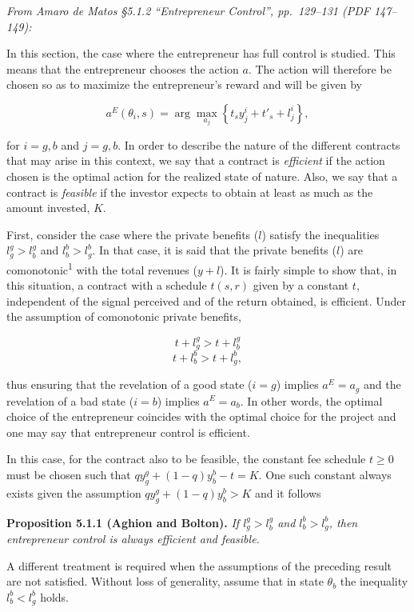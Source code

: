 \documentclass[11pt,a4paper]{article}
\begin{document}
\emph{From Amaro de Matos §5.1.2 ``Entrepreneur Control'', pp.~129--131 (PDF 147--149):}

In this section, the case where the entrepreneur has full control is studied. This means that the
entrepreneur chooses the action \(a\). The action will therefore be chosen so as to maximize the
entrepreneur's reward and will be given by

\[a^E(\theta_i, s) = \arg\max_{a_j}\left\{t_s y^i_j + t'_s + l^i_j\right\},\]

for \(i = g, b\) and \(j = g, b\). In order to describe the nature of the different contracts that
may arise in this context, we say that a contract is \emph{efficient} if the action chosen is the
optimal action for the realized state of nature. Also, we say that a contract is \emph{feasible} if
the investor expects to obtain at least as much as the amount invested, \(K\).

First, consider the case where the private benefits (\(l\)) satisfy the inequalities
\(l^g_g > l^g_b\) and \(l^b_b > l^b_g\). In that case, it is said that the private benefits (\(l\))
are comonotonic\textsuperscript{1} with the total revenues (\(y + l\)). It is fairly simple to show
that, in this situation, a contract with a schedule \(t(s, r)\) given by a constant \(t\),
independent of the signal perceived and of the return obtained, is efficient. Under the assumption
of comonotonic private benefits,

\[t + l^g_g > t + l^g_b\] \[t + l^b_b > t + l^b_g,\]

thus ensuring that the revelation of a good state (\(i = g\)) implies \(a^E = a_g\) and the
revelation of a bad state (\(i = b\)) implies \(a^E = a_b\). In other words, the optimal choice of
the entrepreneur coincides with the optimal choice for the project and one may say that entrepreneur
control is efficient.

In this case, for the contract also to be feasible, the constant fee schedule \(t \geq 0\) must be
chosen such that \(q y^g_g + (1 - q) y^b_b - t = K\). One such constant always exists given the
assumption \(q y^g_g + (1 - q) y^b_b > K\) and it follows

\textbf{Proposition 5.1.1 (Aghion and Bolton).} \emph{If \(l^g_g > l^g_b\) and \(l^b_b > l^b_g\),
then entrepreneur control is always efficient and feasible.}

A different treatment is required when the assumptions of the preceding result are not satisfied.
Without loss of generality, assume that in state \(\theta_b\) the inequality \(l^b_b < l^b_g\)
holds.
\end{document}
